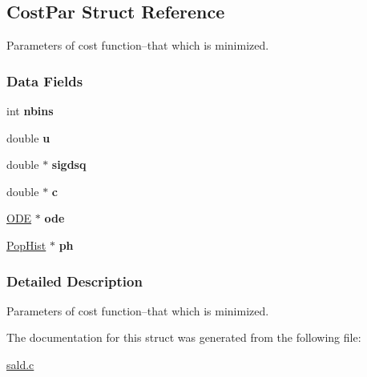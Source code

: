 \hypertarget{struct_cost_par}{\subsection{Cost\-Par Struct Reference}
\label{struct_cost_par}
}


Parameters of cost function--that which is minimized.  


\subsubsection*{Data Fields}
\begin{DoxyCompactItemize}
\item 
\hypertarget{struct_cost_par_add5e631d434542a5173e30adcdede123}{int {\bfseries nbins}}\label{struct_cost_par_add5e631d434542a5173e30adcdede123}

\item 
\hypertarget{struct_cost_par_a04723f4d0a1e478c0025637820342aae}{double {\bfseries u}}\label{struct_cost_par_a04723f4d0a1e478c0025637820342aae}

\item 
\hypertarget{struct_cost_par_a602b33f175bb882f5099e61775821a49}{double $\ast$ {\bfseries sigdsq}}\label{struct_cost_par_a602b33f175bb882f5099e61775821a49}

\item 
\hypertarget{struct_cost_par_ae9baf57b32f714ebbd39510ab9309d48}{double $\ast$ {\bfseries c}}\label{struct_cost_par_ae9baf57b32f714ebbd39510ab9309d48}

\item 
\hypertarget{struct_cost_par_ac7b1e6bd6efc3002a923b7ce7ecff394}{\hyperlink{struct_o_d_e}{O\-D\-E} $\ast$ {\bfseries ode}}\label{struct_cost_par_ac7b1e6bd6efc3002a923b7ce7ecff394}

\item 
\hypertarget{struct_cost_par_a5204e90608fc9e6d04c616c5bc837a27}{\hyperlink{struct_pop_hist}{Pop\-Hist} $\ast$ {\bfseries ph}}\label{struct_cost_par_a5204e90608fc9e6d04c616c5bc837a27}

\end{DoxyCompactItemize}


\subsubsection{Detailed Description}
Parameters of cost function--that which is minimized. 



The documentation for this struct was generated from the following file\-:\begin{DoxyCompactItemize}
\item 
\hyperlink{sald_8c}{sald.\-c}\end{DoxyCompactItemize}
